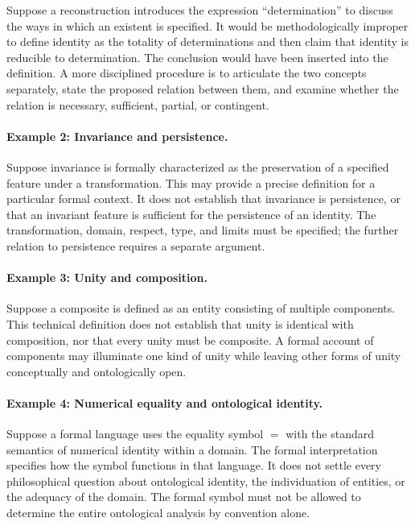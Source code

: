 Suppose a reconstruction introduces the expression
``determination'' to discuss the ways in which an existent is
specified. It would be methodologically improper to define
identity as the totality of determinations and then claim that
identity is reducible to determination. The conclusion would
have been inserted into the definition. A more disciplined
procedure is to articulate the two concepts separately, state
the proposed relation between them, and examine whether the
relation is necessary, sufficient, partial, or contingent.

\paragraph{Example 2: Invariance and persistence.}

Suppose invariance is formally characterized as the preservation
of a specified feature under a transformation. This may provide
a precise definition for a particular formal context. It does
not establish that invariance is persistence, or that an
invariant feature is sufficient for the persistence of an
identity. The transformation, domain, respect, type, and limits
must be specified; the further relation to persistence requires
a separate argument.

\paragraph{Example 3: Unity and composition.}

Suppose a composite is defined as an entity consisting of
multiple components. This technical definition does not
establish that unity is identical with composition, nor that
every unity must be composite. A formal account of components
may illuminate one kind of unity while leaving other forms of
unity conceptually and ontologically open.

\paragraph{Example 4: Numerical equality and ontological identity.}

Suppose a formal language uses the equality symbol \(=\) with
the standard semantics of numerical identity within a domain.
The formal interpretation specifies how the symbol functions
in that language. It does not settle every philosophical
question about ontological identity, the individuation of
entities, or the adequacy of the domain. The formal symbol
must not be allowed to determine the entire ontological
analysis by convention alone.

